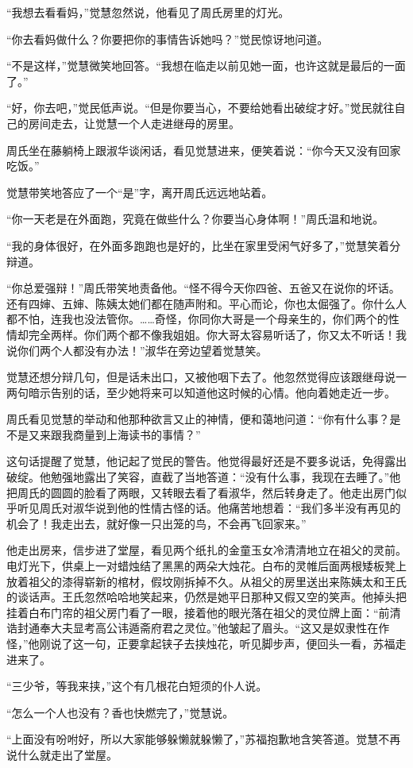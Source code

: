 \par “我想去看看妈，”觉慧忽然说，他看见了周氏房里的灯光。
\par “你去看妈做什么？你要把你的事情告诉她吗？”觉民惊讶地问道。
\par “不是这样，”觉慧微笑地回答。“我想在临走以前见她一面，也许这就是最后的一面了。”
\par “好，你去吧，”觉民低声说。“但是你要当心，不要给她看出破绽才好。”觉民就往自己的房间走去，让觉慧一个人走进继母的房里。
\par 周氏坐在藤躺椅上跟淑华谈闲话，看见觉慧进来，便笑着说：“你今天又没有回家吃饭。”
\par 觉慧带笑地答应了一个“是”字，离开周氏远远地站着。
\par “你一天老是在外面跑，究竟在做些什么？你要当心身体啊！”周氏温和地说。
\par “我的身体很好，在外面多跑跑也是好的，比坐在家里受闲气好多了，”觉慧笑着分辩道。
\par “你总爱强辩！”周氏带笑地责备他。“怪不得今天你四爸、五爸又在说你的坏话。还有四婶、五婶、陈姨太她们都在随声附和。平心而论，你也太倔强了。你什么人都不怕，连我也没法管你。……奇怪，你同你大哥是一个母亲生的，你们两个的性情却完全两样。你们两个都不像我姐姐。你大哥太容易听话了，你又太不听话！我说你们两个人都没有办法！”淑华在旁边望着觉慧笑。
\par 觉慧还想分辩几句，但是话未出口，又被他咽下去了。他忽然觉得应该跟继母说一两句暗示告别的话，至少她将来可以知道他这时候的心情。他向着她走近一步。
\par 周氏看见觉慧的举动和他那种欲言又止的神情，便和蔼地问道：“你有什么事？是不是又来跟我商量到上海读书的事情？”
\par 这句话提醒了觉慧，他记起了觉民的警告。他觉得最好还是不要多说话，免得露出破绽。他勉强地露出了笑容，直截了当地答道：“没有什么事，我现在去睡了。”他把周氏的圆圆的脸看了两眼，又转眼去看了看淑华，然后转身走了。他走出房门似乎听见周氏对淑华说到他的性情古怪的话。他痛苦地想着：“我们多半没有再见的机会了！我走出去，就好像一只出笼的鸟，不会再飞回家来。”
\par 他走出房来，信步进了堂屋，看见两个纸扎的金童玉女冷清清地立在祖父的灵前。电灯光下，供桌上一对蜡烛结了黑黑的两朵大烛花。白布的灵帷后面两根矮板凳上放着祖父的漆得崭新的棺材，假坟刚拆掉不久。从祖父的房里送出来陈姨太和王氏的谈话声。王氏忽然哈哈地笑起来，仍然是她平日那种又假又空的笑声。他掉头把挂着白布门帘的祖父房门看了一眼，接着他的眼光落在祖父的灵位牌上面：“前清诰封通奉大夫显考高公讳遁斋府君之灵位。”他皱起了眉头。“这又是奴隶性在作怪，”他刚说了这一句，正要拿起铗子去挟烛花，听见脚步声，便回头一看，苏福走进来了。
\par “三少爷，等我来挟，”这个有几根花白短须的仆人说。
\par “怎么一个人也没有？香也快燃完了，”觉慧说。
\par “上面没有吩咐好，所以大家能够躲懒就躲懒了，”苏福抱歉地含笑答道。觉慧不再说什么就走出了堂屋。




